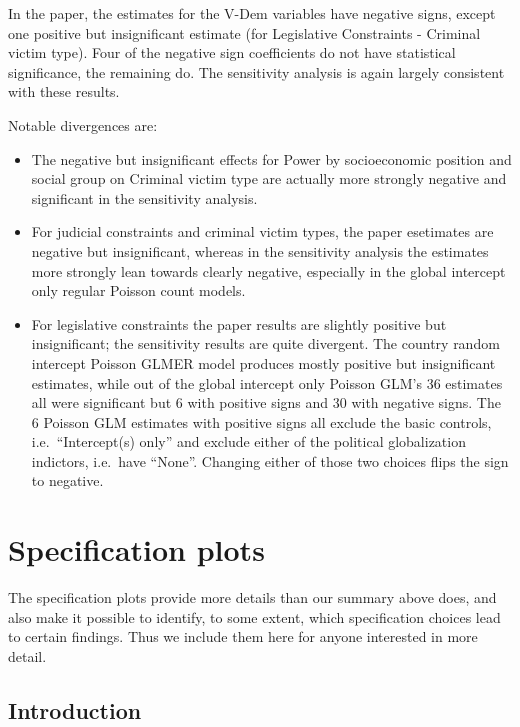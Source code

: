 \documentclass[]{article}
\providecommand{\tightlist}{%
  \setlength{\itemsep}{0pt}\setlength{\parskip}{0pt}}
\begin{document}
In the paper, the estimates for the V-Dem variables have negative signs,
except one positive but insignificant estimate (for Legislative
Constraints - Criminal victim type). Four of the negative sign
coefficients do not have statistical significance, the remaining do. The
sensitivity analysis is again largely consistent with these results.

Notable divergences are:

\begin{itemize}
\tightlist
\item
  The negative but insignificant effects for Power by socioeconomic
  position and social group on Criminal victim type are actually more
  strongly negative and significant in the sensitivity analysis.
\item
  For judicial constraints and criminal victim types, the paper
  esetimates are negative but insignificant, whereas in the sensitivity
  analysis the estimates more strongly lean towards clearly negative,
  especially in the global intercept only regular Poisson count models.
\item
  For legislative constraints the paper results are slightly positive
  but insignificant; the sensitivity results are quite divergent. The
  country random intercept Poisson GLMER model produces mostly positive
  but insignificant estimates, while out of the global intercept only
  Poisson GLM's 36 estimates all were significant but 6 with positive
  signs and 30 with negative signs. The 6 Poisson GLM estimates with
  positive signs all exclude the basic controls, i.e.~``Intercept(s)
  only'' and exclude either of the political globalization indictors,
  i.e.~have ``None''. Changing either of those two choices flips the
  sign to negative.
\end{itemize}

\clearpage

\hypertarget{specification-plots}{%
\section{Specification plots}\label{specification-plots}}

The specification plots provide more details than our summary above
does, and also make it possible to identify, to some extent, which
specification choices lead to certain findings. Thus we include them
here for anyone interested in more detail.

\hypertarget{introduction}{%
\subsection{Introduction}\label{introduction}}
\end{document}
